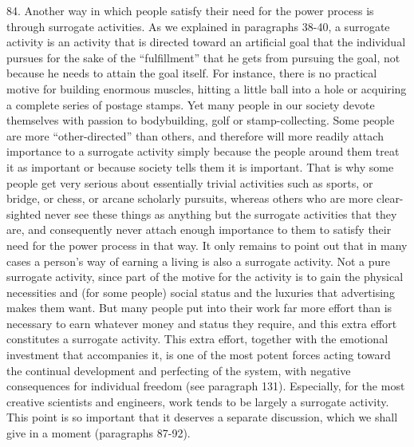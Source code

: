 \documentclass{article}
\begin{document}
84.  Another  way  in  which  people  satisfy  their  need  for  the  power  process  is  through  surrogate  
activities.  As we explained in paragraphs 38-40, a surrogate activity is an activity that is directed 
toward an artificial goal that the individual pursues for the sake of the “fulfillment” that he gets 
from  pursuing  the  goal,  not  because  he  needs  to  attain  the  goal  itself.   For  instance,  there  is  no  
practical  motive  for  building  enormous  muscles,  hitting  a  little  ball  into  a  hole  or  acquiring  a  
complete series of postage stamps.  Yet many people in our society devote themselves with passion 
to bodybuilding, golf or stamp-collecting.  Some people are more “other-directed” than others, and 
therefore  will  more  readily  attach  importance  to  a  surrogate  activity  simply  because  the  people  
around them treat it as important or because society tells them it is important.  That is why some 
people  get  very  serious  about  essentially  trivial  activities  such  as  sports,  or  bridge,  or  chess,  or  
arcane  scholarly  pursuits,  whereas  others  who  are  more  clear-sighted  never  see  these  things  as  
anything  but  the  surrogate  activities  that  they  are,  and  consequently  never  attach  enough  
importance to them to satisfy their need for the power process in that way.  It only remains to point 
out that in many cases a person’s way of earning a living is also a surrogate activity.  Not a pure 
surrogate activity, since part of the motive for the activity is to gain the physical necessities and 
(for  some  people)  social  status  and  the  luxuries  that  advertising  makes  them  want.   But  many  
people put into their work far more effort than is necessary to earn whatever money and status they 
require, and this extra effort constitutes a surrogate activity.  This extra effort, together with the 
emotional  investment  that  accompanies  it,  is  one  of  the  most  potent  forces  acting  toward  the  
continual  development  and  perfecting  of  the  system,  with  negative  consequences  for  individual  
freedom (see paragraph 131).  Especially, for the most creative scientists and engineers, work tends 
to be largely a surrogate activity.  This point is so important that it deserves a separate discussion, 
which we shall give in a moment (paragraphs 87-92). \vspace{\baselineskip}
\end{document}
